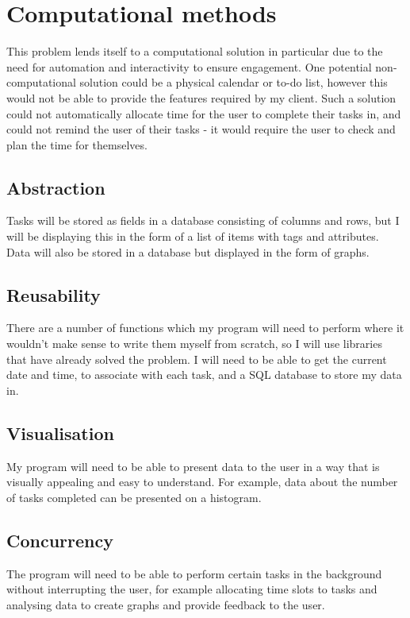 \documentclass{article}
\begin{document}
\section{Computational methods}
This problem lends itself to a computational solution in particular due to the
need for automation and interactivity to ensure engagement. One potential
non-computational solution could be a physical calendar or to-do list, however
this would not be able to provide the features required by my client. Such a
solution could not automatically allocate time for the user to complete their
tasks in, and could not remind the user of their tasks - it would require the
user to check and plan the time for themselves.

\subsection{Abstraction}
Tasks will be stored as fields in a database consisting of columns and rows, but
I will be displaying this in the form of a list of items with tags and
attributes. Data will also be stored in a database but displayed in the form of
graphs.

\subsection{Reusability}
There are a number of functions which my program will need to perform where it
wouldn't make sense to write them myself from scratch, so I will use libraries
that have already solved the problem. I will need to be able to get the current
date and time, to associate with each task, and a SQL database to store my data
in.

\subsection{Visualisation}
My program will need to be able to present data to the user in a way that is
visually appealing and easy to understand. For example, data about the number of
tasks completed can be presented on a histogram.

\subsection{Concurrency}
The program will need to be able to perform certain tasks in the background
without interrupting the user, for example allocating time slots to tasks and
analysing data to create graphs and provide feedback to the user.
\end{document}
